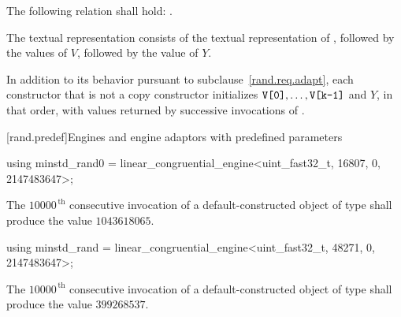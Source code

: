 \pnum
The following relation shall hold:
  .

\pnum
The textual representation%
%
consists of
 the textual representation of ,
followed by
 the  values of $V$,
followed by
 the value of $Y$.

\pnum
In addition to its behavior
pursuant to subclause~\ref{rand.req.adapt},
each constructor%
that is not a copy constructor
initializes $\texttt{V[0]}, \dotsc, \texttt{V[k-1]}$ and $Y$,
in that order,
with values returned by successive invocations of .%




[rand.predef]{Engines and engine adaptors with predefined parameters}%
%
%

%
%
\begin{itemdecl}
using minstd_rand0 =
      linear_congruential_engine<uint_fast32_t, 16807, 0, 2147483647>;
\end{itemdecl}

\begin{itemdescr}
\pnum\required
 The $10000^{\,\mathrm{th}}$ consecutive invocation
 of a default-constructed object
 of type 
 shall produce the value $1043618065$.
\end{itemdescr}

%
%
\begin{itemdecl}
using minstd_rand =
      linear_congruential_engine<uint_fast32_t, 48271, 0, 2147483647>;
\end{itemdecl}

\begin{itemdescr}
\pnum\required
 The $10000^{\,\mathrm{th}}$ consecutive invocation
 of a default-constructed object
 of type 
 shall produce the value $399268537$.
\end{itemdescr}


